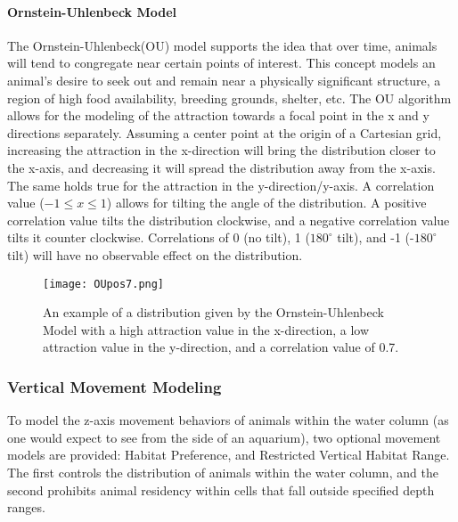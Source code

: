 \paragraph{Ornstein-Uhlenbeck Model}
\label{ouModel}
The Ornstein-Uhlenbeck(OU) model\cite{OU} supports the idea that over time, animals will tend to congregate near certain points of interest.  This concept models an animal's desire to seek out and remain near a physically significant structure, a region of high food availability, breeding grounds, shelter, etc.  The OU algorithm allows for the modeling of the attraction towards a focal point in the x and y directions separately.  Assuming a center point at the origin of a Cartesian grid, increasing the attraction in the x-direction will bring the distribution closer to the x-axis, and decreasing it will spread the distribution away from the x-axis.  The same holds true for the attraction in the y-direction/y-axis.  A correlation value ($-1\le x \le 1$) allows for tilting the angle of the distribution.  A positive correlation value tilts the distribution clockwise, and a negative correlation value tilts it counter clockwise.  Correlations of 0 (no tilt), 1 ($180^{\circ}$ tilt), and -1 (-$180^{\circ}$ tilt) will have no observable effect on the distribution.


\begin{figure}[ht]
	\label{OUimg}
	\centering
	\texttt{[image: OUpos7.png]}
	\caption{An example of a distribution given by the Ornstein-Uhlenbeck Model with a high attraction value in the x-direction, a low attraction value in the y-direction, and a correlation value of 0.7.}
\end{figure}


\subsubsection{Vertical Movement Modeling}
\label{verticalMovement}
To model the z-axis movement behaviors of animals within the water column (as one would expect to see from the side of an aquarium), two optional movement models are provided: Habitat Preference, and Restricted Vertical Habitat Range.  The first controls the distribution of animals within the water column, and the second prohibits animal residency within cells that fall outside specified depth ranges. 

